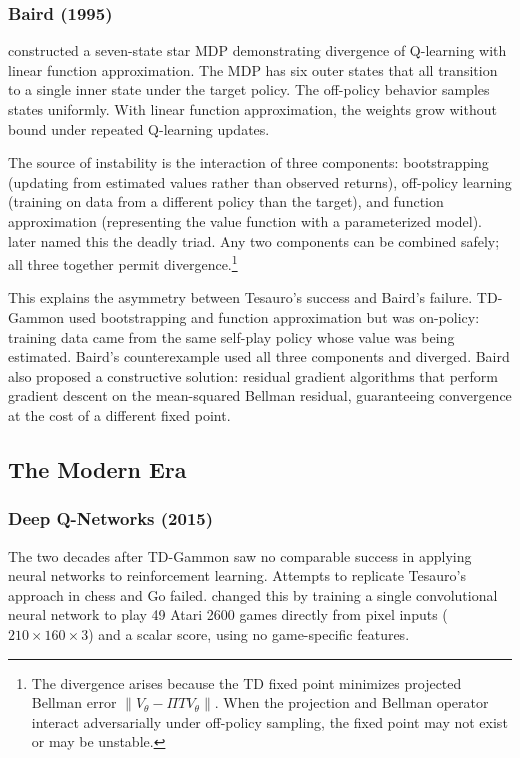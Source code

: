 \subsubsection{Baird (1995)}

\citet{Baird1995} constructed a seven-state star MDP demonstrating divergence of Q-learning with linear function approximation. The MDP has six outer states that all transition to a single inner state under the target policy. The off-policy behavior samples states uniformly. With linear function approximation, the weights grow without bound under repeated Q-learning updates.

The source of instability is the interaction of three components: bootstrapping (updating from estimated values rather than observed returns), off-policy learning (training on data from a different policy than the target), and function approximation (representing the value function with a parameterized model). \citet{sutton2018} later named this the deadly triad. Any two components can be combined safely; all three together permit divergence.\footnote{The divergence arises because the TD fixed point minimizes projected Bellman error $\|V_\theta - \Pi T V_\theta\|$. When the projection and Bellman operator interact adversarially under off-policy sampling, the fixed point may not exist or may be unstable.}

This explains the asymmetry between Tesauro's success and Baird's failure. TD-Gammon used bootstrapping and function approximation but was on-policy: training data came from the same self-play policy whose value was being estimated. Baird's counterexample used all three components and diverged. Baird also proposed a constructive solution: residual gradient algorithms that perform gradient descent on the mean-squared Bellman residual, guaranteeing convergence at the cost of a different fixed point.


\subsection{The Modern Era}

\subsubsection{Deep Q-Networks (2015)}

The two decades after TD-Gammon saw no comparable success in applying neural networks to reinforcement learning. Attempts to replicate Tesauro's approach in chess and Go failed. \citet{mnih2015} changed this by training a single convolutional neural network to play 49 Atari 2600 games directly from pixel inputs ($210 \times 160 \times 3$) and a scalar score, using no game-specific features.

